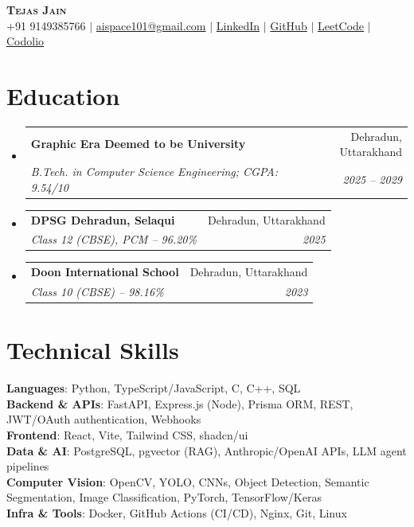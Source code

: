 \documentclass[letterpaper,11pt]{article}
\makeatletter
\newcommand{\resumeSubheading}[4]{
  \item
    \begin{tabular*}{1.0\textwidth}[t]{l@{\extracolsep{\fill}}r}
      \textbf{\small #1} & \small #2 \\
      \textit{\footnotesize #3} & \textit{\footnotesize #4} \\
    \end{tabular*}\vspace{-3.5pt}
}
\newcommand{\resumeSubHeadingListStart}{\begin{itemize}[leftmargin=0.0in, label={}, itemsep=1.5pt, topsep=1pt, parsep=0pt, partopsep=0pt]}
\newcommand{\resumeSubHeadingListEnd}{\end{itemize}\vspace{-1pt}}
\makeatother
\begin{document}
\vspace{-6pt}\begin{center}
    \textbf{\LARGE \scshape Tejas Jain} \\ \vspace{2pt}
    \footnotesize +91 9149385766 $|$ \href{mailto:aispace101@gmail.com}{aispace101@gmail.com} $|$
    \href{https://www.linkedin.com/in/tejas-jain-spacefighter/}{LinkedIn} $|$
    \href{https://github.com/Space-Fighter}{GitHub} $|$
    \href{https://leetcode.com/u/Space-Fighter/}{LeetCode} $|$
    \href{https://codolio.com/profile/Space-Fighter}{Codolio}
\end{center}
\vspace{-6pt}

\section{Education}
  \resumeSubHeadingListStart
    \resumeSubheading
      {Graphic Era Deemed to be University}{Dehradun, Uttarakhand}
      {B.Tech. in Computer Science Engineering; CGPA: 9.54/10}{2025 -- 2029}
    \resumeSubheading
      {DPSG Dehradun, Selaqui}{Dehradun, Uttarakhand}
      {Class 12 (CBSE), PCM -- 96.20\%}{2025}
    \resumeSubheading
      {Doon International School}{Dehradun, Uttarakhand}
      {Class 10 (CBSE) -- 98.16\%}{2023}
  \resumeSubHeadingListEnd

\section{Technical Skills}
 \begin{itemize}[leftmargin=0.0in, label={}, itemsep=0pt, topsep=1pt]
    \small{\item{
     \textbf{Languages}{: Python, TypeScript/JavaScript, C, C++, SQL} \\
     \textbf{Backend \& APIs}{: FastAPI, Express.js (Node), Prisma ORM, REST, JWT/OAuth authentication, Webhooks} \\
     \textbf{Frontend}{: React, Vite, Tailwind CSS, shadcn/ui} \\
     \textbf{Data \& AI}{: PostgreSQL, pgvector (RAG), Anthropic/OpenAI APIs, LLM agent pipelines} \\
     \textbf{Computer Vision}{: OpenCV, YOLO, CNNs, Object Detection, Semantic Segmentation, Image Classification, PyTorch, TensorFlow/Keras} \\
     \textbf{Infra \& Tools}{: Docker, GitHub Actions (CI/CD), Nginx, Git, Linux}
    }}
 \end{itemize}
 \vspace{-4pt}
\end{document}
